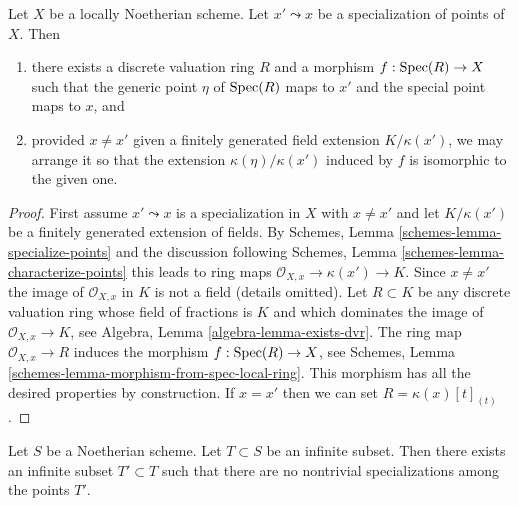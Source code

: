 \begin{lemma}
\label{lemma-locally-Noetherian-specialization-dvr}
Let $X$ be a locally Noetherian scheme.
Let $x' \leadsto x$ be a specialization of points of $X$. Then
\begin{enumerate}
\item there exists a discrete valuation ring $R$ and a morphism
$f : \mathop{\mathrm{Spec}}(R) \to X$ such that the generic point $\eta$ of
$\mathop{\mathrm{Spec}}(R)$ maps to $x'$ and the special point maps to $x$, and
\item provided $x \not = x'$ given a finitely generated field
extension $K/\kappa(x')$, we may arrange it so that the extension
$\kappa(\eta)/\kappa(x')$
induced by $f$ is isomorphic to the given one.
\end{enumerate}
\end{lemma}

\begin{proof}
First assume $x' \leadsto x$ is a specialization in $X$
with $x \not = x'$ and let $K/\kappa(x')$ be a finitely
generated extension of fields. By
Schemes, Lemma \ref{schemes-lemma-specialize-points}
and the discussion following
Schemes, Lemma \ref{schemes-lemma-characterize-points}
this leads to ring maps $\mathcal{O}_{X, x} \to \kappa(x') \to K$.
Since $x \not = x'$ the image of $\mathcal{O}_{X, x}$ in $K$
is not a field (details omitted).
Let $R \subset K$ be any discrete valuation ring whose field of fractions is
$K$ and which dominates the image of $\mathcal{O}_{X, x} \to K$, see
Algebra, Lemma \ref{algebra-lemma-exists-dvr}.
The ring map $\mathcal{O}_{X, x} \to R$ induces the morphism
$f : \mathop{\mathrm{Spec}}(R) \to X$, see
Schemes, Lemma \ref{schemes-lemma-morphism-from-spec-local-ring}.
This morphism has all the desired properties by construction.
If $x = x'$ then we can set $R = \kappa(x)[t]_{(t)}$.
\end{proof}

\begin{lemma}
\label{lemma-thin-infinite-sequence}
Let $S$ be a Noetherian scheme. Let $T \subset S$ be an infinite subset.
Then there exists an infinite subset $T' \subset T$
such that there are no nontrivial specializations among the points $T'$.
\end{lemma}

